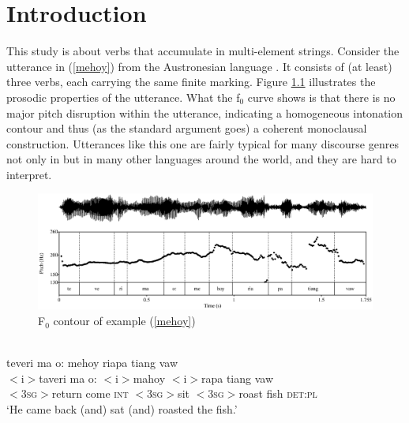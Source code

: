 \chapter{Introduction}
\label{ch:introduction}
This study is about verbs that accumulate in multi-element strings. Consider the utterance in (\ref{mehoy}) from the Austronesian language . It consists of (at least) three verbs, each carrying the same finite marking. Figure \ref{fig:ex1_pitch} illustrates the pro\-sod\-ic properties of the utterance. What the f$_0$ curve shows is that there is no major pitch disruption within the utterance, indicating a homogeneous intonation contour and thus (as the standard argument goes) a coherent monoclausal construction. Utterances like this one are fairly typical for many discourse genres not only in  but in many other languages around the world, and they are hard to interpret.

\begin{figure}
\begin{center}
\includegraphics[width=1.0\textwidth]{figures/mehoy.eps} 
\caption{F$_0$ contour of example (\ref{mehoy})}\label{fig:ex1_pitch}
\end{center}
\end{figure}

\ea \label{mehoy}
\\
\glll teveri ma o: mehoy riapa tiang vaw\\
$<$i$>$taveri ma o: $<$i$>$mahoy $<$i$>$rapa tiang vaw\\
$<$3\textsc{sg}$>$return come \textsc{int} $<$3\textsc{sg}$>$sit $<$3\textsc{sg}$>$roast fish \textsc{det}:\textsc{pl}\\
\glt ‘He came back (and) sat (and) roasted the fish.’
\z

